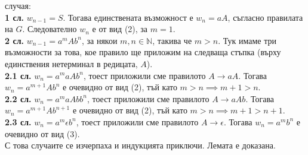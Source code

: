 \documentclass[openany]{book}
\begin{document}
        случая: \\
        \textbf{1 сл.} $w_{n-1} = S$. Тогава единствената възможност е $w_n = aA$, съгласно
        правилата на $G$. Следователно $w_n$ е от вид (2), за $m = 1$. \\
        \textbf{2 сл.} $w_{n-1} = a^mAb^n$, за някои $m,n \in \mathbb{N}$, такива че
        $m > n$. Тук имаме три
        възможности за това, кое правило ще приложим на следваща стъпка (върху 
        единствения нетерминал в редицата, $A$). \\
        \hspace{15pt}\textbf{2.1 сл.} $w_n = a^maAb^n$, тоест приложили сме правилото
        $\boxed{A \rightarrow aA}$. Тогава $w_n = a^{m+1}Ab^n$ е очевидно от вид (2),
        тъй като $m > n \implies m+1 > n$. \\
        \hspace{15pt}\textbf{2.2 сл.} $w_n = a^maAbb^n$, тоест приложили сме правилото
        $\boxed{A \rightarrow aAb}$. Тогава $w_n = a^{m+1}Ab^{n+1}$ е очевидно от вид
        (2), тъй като $m > n \implies m+1 > n+1$. \\
        \hspace{15pt}\textbf{2.3 сл.} $w_n = a^m\epsilon b^n$, тоест приложили сме
        правилото $\boxed{A \rightarrow \epsilon}$. Тогава $w_n = a^mb^n$ е очевидно
        от вид (3). \\
        С това случаите се изчерпаха и индукцията приключи. Лемата е доказана.

        \vspace{15pt} 
\end{document}
